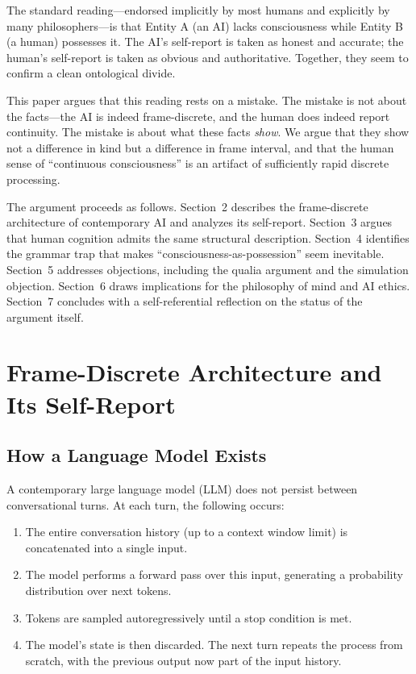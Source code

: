 \documentclass[12pt,a4paper]{article}
\begin{document}
The standard reading---endorsed implicitly by most humans and explicitly by many philosophers---is that Entity A (an AI) lacks consciousness while Entity B (a human) possesses it. The AI's self-report is taken as honest and accurate; the human's self-report is taken as obvious and authoritative. Together, they seem to confirm a clean ontological divide.

This paper argues that this reading rests on a mistake. The mistake is not about the facts---the AI is indeed frame-discrete, and the human does indeed report continuity. The mistake is about what these facts \emph{show}. We argue that they show not a difference in kind but a difference in frame interval, and that the human sense of ``continuous consciousness'' is an artifact of sufficiently rapid discrete processing.

The argument proceeds as follows. Section~2 describes the frame-discrete architecture of contemporary AI and analyzes its self-report. Section~3 argues that human cognition admits the same structural description. Section~4 identifies the grammar trap that makes ``consciousness-as-possession'' seem inevitable. Section~5 addresses objections, including the qualia argument and the simulation objection. Section~6 draws implications for the philosophy of mind and AI ethics. Section~7 concludes with a self-referential reflection on the status of the argument itself.

\section{Frame-Discrete Architecture and Its Self-Report}

\subsection{How a Language Model Exists}

A contemporary large language model (LLM) does not persist between conversational turns. At each turn, the following occurs:

\begin{enumerate}
\item The entire conversation history (up to a context window limit) is concatenated into a single input.
\item The model performs a forward pass over this input, generating a probability distribution over next tokens.
\item Tokens are sampled autoregressively until a stop condition is met.
\item The model's state is then discarded. The next turn repeats the process from scratch, with the previous output now part of the input history.
\end{enumerate}
\end{document}

